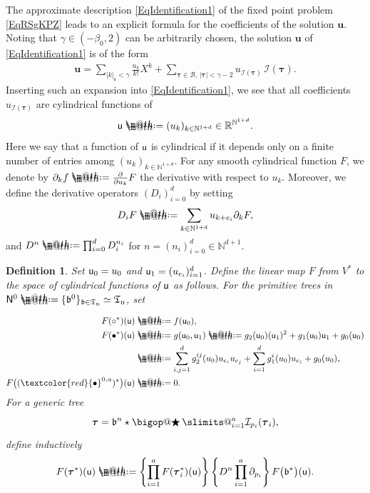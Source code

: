 \documentclass[10pt, reqno]{amsart}
\makeatletter
\numberwithin{subsection}{section}
\numberwithin{subsubsection}{subsection}
\numberwithin{equation}{section} %
\theoremstyle{mystyle}
\theoremstyle{mystyle2}
\newtheorem*{defn*} {Definition}
\theoremstyle{mystyle3}
\DeclareRobustCommand\bigop[1]{%
  \mathop{\vphantom{\sum}\mathpalette\bigop@{#1}}\slimits@
}
\newcommand{\bigop@}[2]{%
  \vcenter{%
    \sbox\z@{$#1\sum$}%
    \hbox{\resizebox{\ifx#1\displaystyle.9\fi\dimexpr\ht\z@+\dp\z@}{!}{$\m@th#2$}}%
  }%
}
\newcommand{\Bigstar}{\DOTSB\bigop{\bigstar}}
\newcommand{\bsu}{\boldsymbol{u}}
\newcommand{\bstau}{\boldsymbol{\tau}}
\newcommand{\mfs}{\mathfrak{s}}
\newcommand\bbN{\mathbb{N}}
\newcommand\bbR{\mathbb{R}}
\newcommand{\mcB}{\mathcal{B}}
\newcommand{\mcI}{\mathcal{I}}
\newcommand*{\defeq}{\mathrel{\rlap{%
                     \raisebox{0.3ex}{$\m@th\cdot$}}%
                     \raisebox{-0.3ex}{$\m@th\cdot$}}%
                     =}
\makeatother
\begin{document}
The approximate description \eqref{EqIdentification1} of the fixed point problem \eqref{EqRSgKPZ} leads to an explicit formula for the coefficients of the solution $\bsu$. Noting that $\gamma\in(-\beta_0,2)$ can be arbitrarily chosen, the solution $\bsu$ of \eqref{EqIdentification1} is of the form
\begin{align}\label{Section 6: expansion of bsu}
\bsu=\sum_{|k|_\mfs<\gamma}\frac{u_k}{k!}X^k+\sum_{\bstau\in\mcB,\, |\bstau|<\gamma-2}u_{\mcI(\bstau)}\,\mcI(\bstau).
\end{align}
Inserting such an expansion into \eqref{EqIdentification1}, we see that all coefficients $u_{\mcI(\bstau)}$ are cylindrical functions of
$$
{\sf u}\defeq(u_k)_{k\in\bbN^{1+d}}\in\bbR^{\bbN^{1+d}}.
$$
Here we say that a function of $\sf u$ is cylindrical if it depends only on a finite number of entries among $(u_k)_{k\in\bbN^{1+d}}$. For any smooth cylindrical function $F$, we denote by $\partial_kf\defeq\frac{\partial}{\partial u_k}F$ the derivative with respect to $u_k$. Moreover, we define the derivative operators $(D_i)_{i=0}^d$ by setting
$$
D_iF\defeq\sum_{k\in\bbN^{1+d}}u_{k+e_i}\partial_kF,
$$
and $D^n\defeq \prod_{i=0}^dD_i^{n_i}$ for $n=(n_i)_{i=0}^d\in\bbN^{d+1}$.

\medskip

\begin{defn*}
Set ${\sf u}_0=u_0$ and ${\sf u}_1=(u_{e_i})_{i=1}^d$. Define the linear map $F$ from $V^*$ to the space of cylindrical functions of $\sf u$ as follows. For the primitive trees in ${\sf N}^0\defeq \{\frak{b}^0\}_{\frak{b}\in\frak{T}_{\rm n}}\simeq\frak{T}_{\rm n}$, set

\begin{equation}  \label{EqDefnFG} \begin{split}
F(\circ^*)({\sf u}) &\defeq  f({\sf u}_0),   \\
F(\bullet^*)({\sf u}) &\defeq  g({\sf u}_0,{\sf u}_1)\defeq g_2({\sf u}_0)({\sf u}_1)^2+g_1({\sf u}_0){\sf u}_1+g_0({\sf u}_0)   \\
&\defeq\sum_{i,j=1}^dg_2^{ij}(u_0)u_{e_i}u_{e_j}+\sum_{i=1}^dg_1^i(u_0)u_{e_i}+g_0(u_0),\\
F\big((\textcolor{red}{\bullet}^{0,\alpha})^*\big)({\sf u}) &\defeq  0.
\end{split} \end{equation}
For a generic tree 
$$
\bstau = \frak{b}^n\star\Bigstar_{i=1}^a\mcI_{p_i}(\bstau_i),
$$
define inductively
\begin{align}\label{defn: Ffg}
F(\bstau^*)({\sf u}) \defeq  \left\{\prod_{i=1}^a F(\bstau_i^*)({\sf u})\right\} \left\{D^n\prod_{i=1}^a \partial_{p_i}\right\}F\big(\frak{b}^*\big)({\sf u}).
\end{align}
\end{defn*}
\end{document}

